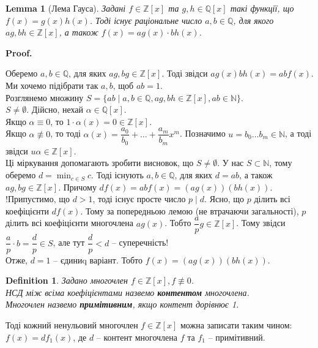 \documentclass[a4paper, 10pt]{article}
\makeatletter
\theoremstyle{theoremdd}
\theoremstyle{theoremdd}
\newtheorem{definition}[theorem]{Definition}
\theoremstyle{theoremdd}
\theoremstyle{theoremdd}
\theoremstyle{theoremdd}
\theoremstyle{theoremdd}
\theoremstyle{theoremdd}
\theoremstyle{theoremdd}
\theoremstyle{theoremdd}
\theoremstyle{theoremdd}
\theoremstyle{theoremdd}
\theoremstyle{theoremdd}
\theoremstyle{theoremdd}
\newtheorem{lemma}[theorem]{Lemma}
\theoremstyle{theoremdd}
\theoremstyle{theoremdd}
\renewenvironment{proof}[1][Proof.\\]{\par
\pushQED{\hfill \qed}%
\normalfont \topsep6\p@\@plus6\p@\relax
\trivlist
\item\relax
{\bfseries
#1\@addpunct{.}}\hspace\labelsep\ignorespaces
}{%
\popQED\endtrivlist\@endpefalse
}
\makeatother
\begin{document}
\begin{lemma}[Лема Гауса]
Задані $f \in \mathbb{Z}[x]$ та $g,h \in \mathbb{Q}[x]$ такі функції, що $f(x) = g(x)h(x)$. Тоді існує раціональне число $a,b \in \mathbb{Q}$, для якого $ag, bh \in \mathbb{Z}[x]$, а також $f(x) = ag(x) \cdot bh(x)$.
\end{lemma}

\begin{proof}
Оберемо $a,b \in \mathbb{Q}$, для яких $ag, bg \in \mathbb{Z}[x]$. Тоді звідси $a g(x) b h(x) = ab f(x)$. Ми хочемо підібрати так $a,b$, щоб $ab = 1$.\\
Розглянемо множину $S = \{ ab \mid a,b \in \mathbb{Q}, ag, bh \in \mathbb{Z}[x], ab \in \mathbb{N}\}$.\\
$S \neq \emptyset$. Дійсно, нехай $\alpha \in \mathbb{Q}[x]$.\\
Якщо $\alpha \equiv 0$, то $1 \cdot \alpha(x) = 0 \in \mathbb{Z}[x]$.\\
Якщо $\alpha \not\equiv 0$, то тоді $\alpha(x) = \dfrac{a_0}{b_0} + \dots + \dfrac{a_m}{b_m}x^m$. Позначимо $u = b_0 \dots b_m \in \mathbb{N}$, а тоді звідси $u \alpha \in \mathbb{Z}[x]$.\\
Ці міркування допомагають зробити висновок, що $S \neq \emptyset$. У нас $S \subset \mathbb{N}$, тому оберемо $d = \displaystyle\min_{c \in S} c$. Тоді існують $a,b \in \mathbb{Q}$, для яких $d = ab$, а також $ag,bg \in \mathbb{Z}[x]$. Причому $df(x) = abf(x) = (ag(x))(bh(x))$.\\
!Припустимо, що $d > 1$, тоді існує просте число $p \mid d$. Ясно, що $p$ ділить всі коефіцієнти $df(x)$. Тому за попередньою лемою (не втрачаючи загальності), $p$ ділить всі коефіцієнти многочлена $ag(x)$. Тобто $\dfrac{a}{p} g \in \mathbb{Z}[x]$. Тому звідси $\dfrac{a}{p} \cdot b = \dfrac{d}{p} \in S$, але тут $\dfrac{d}{p} < d$ -- суперечність!\\
Отже, $d = 1$ -- єдиниq варіант. Тобто $f(x) = (ag(x))(bh(x))$.
\end{proof}

\begin{definition}
Задано многочлен $f \in \mathbb{Z}[x], f \not\equiv 0$.\\
НСД між всіма коефіцієнтами назвемо \textbf{контентом} многочлена.\\
Многочлен назвемо \textbf{примітивним}, якщо контент дорівнює 1.
\end{definition}

Тоді кожний ненульовий многочлен $f \in \mathbb{Z}[x]$ можна записати таким чином:\\ 
$f(x) = d f_1(x)$, де $d$ -- контент многочлена $f$ та $f_1$ -- примітивний.
\end{document}
